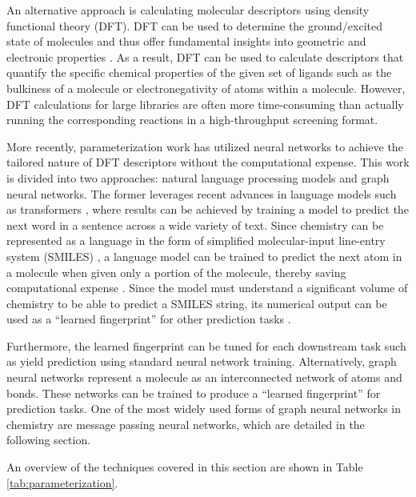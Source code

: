 An alternative approach is calculating molecular descriptors using density functional theory (DFT). DFT can be used to determine the ground/excited state of molecules and thus offer fundamental insights into geometric and electronic properties \cite{Shields2021}. As a result, DFT can be used to calculate descriptors that quantify the specific chemical properties of the given set of ligands such as the bulkiness of a molecule or electronegativity of atoms within a molecule. However, DFT calculations for large libraries are often more time-consuming than actually running the corresponding reactions in a high-throughput screening format.

More recently, parameterization work has utilized neural networks to achieve the tailored nature of DFT descriptors without the computational expense. This work is divided into two approaches: natural language processing models and graph neural networks. The former leverages recent advances in language models such as transformers \cite{Vaswani2017}, where results can be achieved by training a model to predict the next word in a sentence across a wide variety of text. Since chemistry can be represented as a language in the form of simplified molecular-input line-entry system (SMILES) \cite{Weininger1988}, a language model can be trained to predict the next atom in a molecule when given only a portion of the molecule, thereby saving computational expense \cite{Schwaller2019}. Since the model must understand a significant volume of chemistry to be able to predict a SMILES string, its numerical output can be used as a “learned fingerprint” for other prediction tasks \cite{Schwaller2021}.

Furthermore, the learned fingerprint can be tuned for each downstream task such as yield prediction using standard neural network training. Alternatively, graph neural networks represent a molecule as an interconnected network of atoms and bonds. These networks can be trained to produce a “learned fingerprint” for prediction tasks. One of the most widely used forms of graph neural networks in chemistry are message passing neural networks, which are detailed in the following section.

An overview of the techniques covered in this section are shown in Table \ref{tab:parameterization}.

